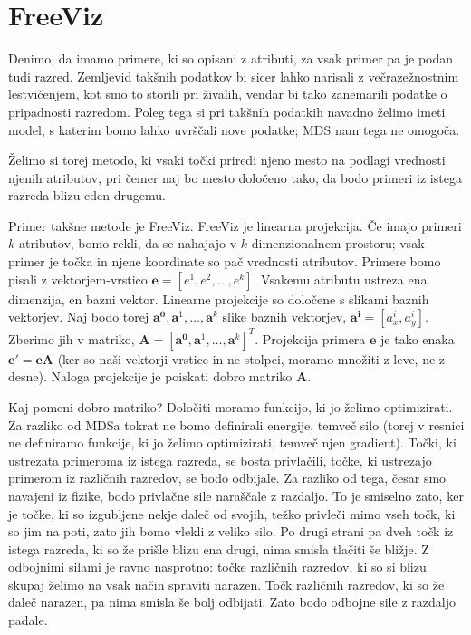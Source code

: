 \section{FreeViz}

Denimo, da imamo primere, ki so opisani z atributi, za vsak primer pa je podan tudi razred. Zemljevid takšnih podatkov bi sicer lahko narisali z večrazežnostnim lestvičenjem, kot smo to storili pri živalih, vendar bi tako zanemarili podatke o pripadnosti razredom. Poleg tega si pri takšnih podatkih navadno želimo imeti model, s katerim bomo lahko uvrščali nove podatke; MDS nam tega ne omogoča.

Želimo si torej metodo, ki vsaki točki priredi njeno mesto na podlagi vrednosti njenih atributov, pri čemer naj bo mesto določeno tako, da bodo primeri iz istega razreda blizu eden drugemu.

Primer takšne metode je FreeViz. FreeViz je linearna projekcija. Če imajo primeri $k$ atributov, bomo rekli, da se nahajajo v $k$-dimenzionalnem prostoru; vsak primer je točka in njene koordinate so pač vrednosti atributov. Primere bomo pisali z vektorjem-vrstico $\mathbf{e} = [e^1, e^2, 
\ldots, e^k]$. Vsakemu atributu ustreza ena dimenzija, en bazni vektor. Linearne projekcije so določene s slikami baznih vektorjev. Naj bodo torej $\mathbf{a^0}, \mathbf{a}^1, \ldots, \mathbf{a}^k$ slike baznih vektorjev, $\mathbf{a^i} = [a_x^i, a_y^i]$. Zberimo jih v matriko, $\mathbf{A} = [\mathbf{a^0}, \mathbf{a}^1, \ldots, \mathbf{a}^k]^T$. Projekcija primera $\mathbf{e}$ je tako enaka $\mathbf{e'} = \mathbf{eA}$ (ker so naši vektorji vrstice in ne stolpci, moramo množiti z leve, ne z desne). Naloga projekcije je poiskati dobro matriko $\mathbf{A}$.

Kaj pomeni dobro matriko? Določiti moramo funkcijo, ki jo želimo optimizirati. Za razliko od MDSa tokrat ne bomo definirali energije, temveč silo (torej v resnici ne definiramo funkcije, ki jo želimo optimizirati, temveč njen gradient). Točki, ki ustrezata primeroma iz istega razreda, se bosta privlačili, točke, ki ustrezajo primerom iz različnih razredov, se bodo odbijale. Za razliko od tega, česar smo navajeni iz fizike, bodo privlačne sile naraščale z razdaljo. To je smiselno zato, ker je točke, ki so izgubljene nekje daleč od svojih, težko privleči mimo vseh točk, ki so jim na poti, zato jih bomo vlekli z veliko silo. Po drugi strani pa dveh točk iz istega razreda, ki so že prišle blizu ena drugi, nima smisla tlačiti še bližje. Z odbojnimi silami je ravno nasprotno: točke različnih razredov, ki so si blizu skupaj želimo na vsak način spraviti narazen. Točk različnih razredov, ki so že daleč narazen, pa nima smisla še bolj odbijati. Zato bodo odbojne sile z razdaljo padale.


